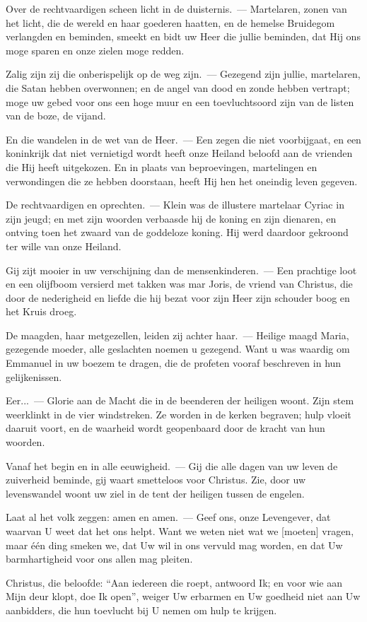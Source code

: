 \documentclass[12pt,twoside,a5paper]{article}
\begin{document}
\begin{halfparskip}
  Over de rechtvaardigen scheen licht in de duisternis.~--- Martelaren, zonen van het licht, die de wereld en haar goederen haatten, en de hemelse Bruidegom verlangden en beminden, smeekt en bidt uw Heer die jullie beminden, dat Hij ons moge sparen en onze zielen moge redden.

  Zalig zijn zij die onberispelijk op de weg zijn.~--- Gezegend zijn jullie, martelaren, die Satan hebben overwonnen; en de angel van dood en zonde hebben vertrapt; moge uw gebed voor ons een hoge muur en een toevluchtsoord zijn van de listen van de boze, de vijand.

  En die wandelen in de wet van de Heer.~--- Een zegen die niet voorbijgaat, en een koninkrijk dat niet vernietigd wordt heeft onze Heiland beloofd aan de vrienden die Hij heeft uitgekozen. En in plaats van beproevingen, martelingen en verwondingen die ze hebben doorstaan, heeft Hij hen het oneindig leven gegeven.

  De rechtvaardigen en oprechten.~--- Klein was de illustere martelaar Cyriac in zijn jeugd; en met zijn woorden verbaasde hij de koning en zijn dienaren, en ontving toen het zwaard van de goddeloze koning. Hij werd daardoor gekroond ter wille van onze Heiland.

  Gij zijt mooier in uw verschijning dan de mensenkinderen.~--- Een prachtige loot en een olijfboom versierd met takken was mar Joris, de vriend van Christus, die door de nederigheid en liefde die hij bezat voor zijn Heer zijn schouder boog en het Kruis droeg.

  De maagden, haar metgezellen, leiden zij achter haar.~--- Heilige maagd Maria, gezegende moeder, alle geslachten noemen u gezegend. Want u was waardig om Emmanuel in uw boezem te dragen, die de profeten vooraf beschreven in hun gelijkenissen.

  Eer...~--- Glorie aan de Macht die in de beenderen der heiligen woont. Zijn stem weerklinkt in de vier windstreken. Ze worden in de kerken begraven; hulp vloeit daaruit voort, en de waarheid wordt geopenbaard door de kracht van hun woorden.

  Vanaf het begin en in alle eeuwigheid.~--- Gij die alle dagen van uw leven de zuiverheid beminde, gij waart smetteloos voor Christus. Zie, door uw levenswandel woont uw ziel in de tent der heiligen tussen de engelen.

  Laat al het volk zeggen: amen en amen.~--- Geef ons, onze Levengever, dat waarvan U weet dat het ons helpt. Want we weten niet wat we [moeten] vragen, maar één ding smeken we, dat Uw wil in ons vervuld mag worden, en dat Uw barmhartigheid voor ons allen mag pleiten.

  Christus, die beloofde: ``Aan iedereen die roept, antwoord Ik; en voor wie aan Mijn deur klopt, doe Ik open'', weiger Uw erbarmen en Uw goedheid niet aan Uw aanbidders, die hun toevlucht bij U nemen om hulp te krijgen.
\end{halfparskip}
\end{document}
